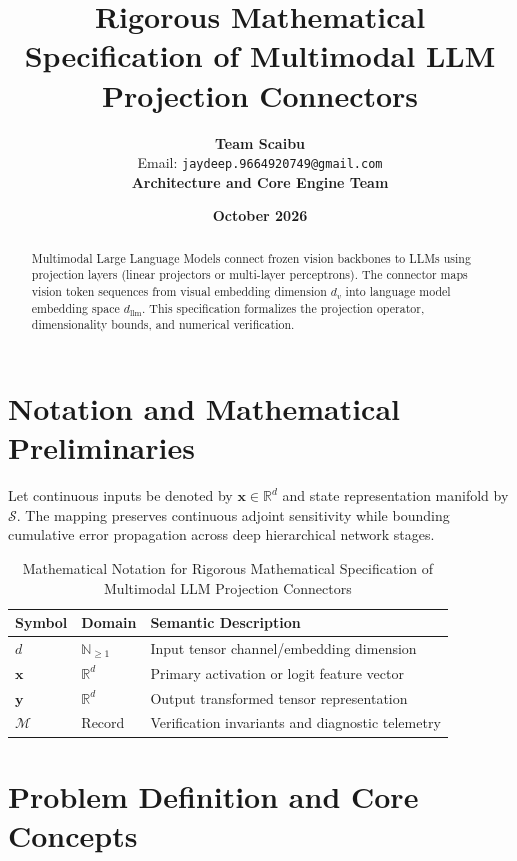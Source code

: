 \documentclass[11pt,a4paper]{article}
\title{\textbf{Rigorous Mathematical Specification of Multimodal LLM Projection Connectors}}
\author{\textbf{Team Scaibu} \\ \small Email: \texttt{jaydeep.9664920749@gmail.com} \\ \small \textbf{Architecture and Core Engine Team}}
\date{\textbf{October 2026}}
\theoremstyle{definition}
\begin{document}
\maketitle

\begin{abstract}
Multimodal Large Language Models connect frozen vision backbones to LLMs using projection layers (linear projectors or multi-layer perceptrons). The connector maps vision token sequences from visual embedding dimension $d_v$ into language model embedding space $d_{\text{llm}}$. This specification formalizes the projection operator, dimensionality bounds, and numerical verification.
\end{abstract}

\section{Notation and Mathematical Preliminaries}

Let continuous inputs be denoted by $\mathbf{x} \in \mathbb{R}^d$ and state representation manifold by $\mathcal{S}$. The mapping preserves continuous adjoint sensitivity while bounding cumulative error propagation across deep hierarchical network stages.

\begin{table}[h]
\centering
\caption{Mathematical Notation for Rigorous Mathematical Specification of Multimodal LLM Projection Connectors}
\begin{tabular}{lll}
\toprule
\textbf{Symbol} & \textbf{Domain} & \textbf{Semantic Description} \\
\midrule
$d$ & $\mathbb{N}_{\ge 1}$ & Input tensor channel/embedding dimension \\
$\mathbf{x}$ & $\mathbb{R}^d$ & Primary activation or logit feature vector \\
$\mathbf{y}$ & $\mathbb{R}^d$ & Output transformed tensor representation \\
$\mathcal{M}$ & Record & Verification invariants and diagnostic telemetry \\
\bottomrule
\end{tabular}
\end{table}

\section{Problem Definition and Core Concepts}
\end{document}
